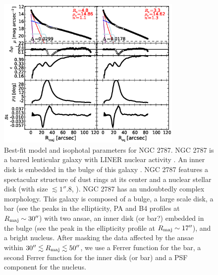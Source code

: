 \documentclass[preprint2]{emulateapj}
\newcommand{\fitfigurewidth}{0.8\textwidth}
\begin{document}
  \begin{figure}[h]
  \begin{center}
  \includegraphics[width=\fitfigurewidth]{images/n2787_1Dfit.eps}
  \caption{Best-fit model and isophotal parameters for NGC 2787.
  NGC 2787 is a barred lenticular galaxy with LINER nuclear activity \citep{veroncettyveron2006}.
  An inner disk is embedded in the bulge of this galaxy \citep{erwin2003n2787}.
  NGC 2787 features a spectacular structure of dust rings at its center \citep{erwinsparke2003}
  and a nuclear stellar disk (with size $\lesssim 1''.8$, \citealt{ledo2010}).
  NGC 2787 has an undoubtedly complex morphology. 
  This galaxy is composed of a bulge, a large scale disk, a bar (see the peaks in the ellipticity, PA and B4 profiles
  at $R_{\rm maj} \sim 30''$) with two ansae, an inner disk (or bar?) embedded in the bulge (see the peak in the ellipticity profile
  at $R_{\rm maj} \sim 17''$), and a bright nucleus.
  After masking the data affected by the ansae within $30'' \lesssim R_{\rm maj} \lesssim 50''$,
  we use a Ferrer function for the bar, a second Ferrer function for the inner disk (or bar) 
  and a PSF component for the nucleus. 
}
\end{center}
\end{figure}
\end{document}
